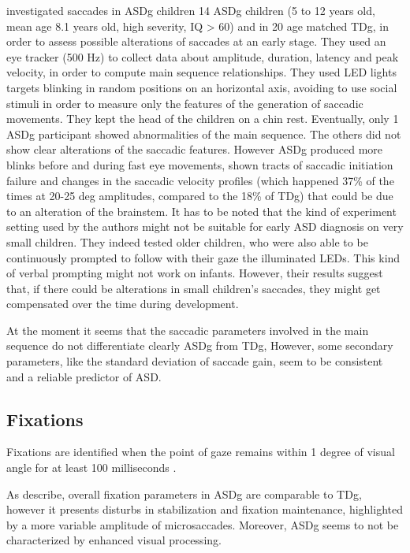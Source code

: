 \cite{pensiero2009saccades} investigated saccades in ASDg children 14 ASDg children (5 to 12 years old, mean age 8.1 years old, high severity, IQ > 60) and in 20 age matched TDg, in order to assess possible alterations of saccades at an early stage. They used an eye tracker (500 Hz) to collect data about amplitude, duration, latency and peak velocity, in order to compute main sequence relationships. They used LED lights targets blinking in random positions on an horizontal axis, avoiding to use social stimuli in order to measure only the features of the generation of saccadic movements. They kept the head of the children on a chin rest.
Eventually, only 1 ASDg participant showed abnormalities of the main sequence. The others did not show clear alterations of the saccadic features. However ASDg produced more blinks before and during fast eye movements, shown tracts of saccadic initiation failure and changes in the saccadic velocity profiles (which happened 37\% of the times at 20-25 deg amplitudes, compared to the 18\% of TDg) that could be due to an alteration of the brainstem.
It has to be noted that the kind of experiment setting used by the authors might not be suitable for early ASD diagnosis on very small children. They indeed tested older children, who were also able to be continuously prompted to follow with their gaze the illuminated LEDs. This kind of verbal prompting might not work on infants. However, their results suggest that, if there could be alterations in small children’s saccades, they might get compensated over the time during development.

At the moment it seems that the saccadic parameters involved in the main sequence do not differentiate clearly ASDg from TDg, However, some secondary parameters, like the standard deviation of saccade gain, seem to be consistent and a reliable predictor of ASD.


\subsection{Fixations}
\label{sec:fixationsstheory}

Fixations are identified when the point of gaze remains within 1 degree of visual angle for at least 100 milliseconds \citep{boraston2007eyetrackingASD}.

As \cite{johnson2016review} describe, overall fixation parameters in ASDg are comparable to TDg, however it presents disturbs in stabilization and fixation maintenance, highlighted by a more variable amplitude of microsaccades. Moreover, ASDg seems to not be characterized by enhanced visual processing.

